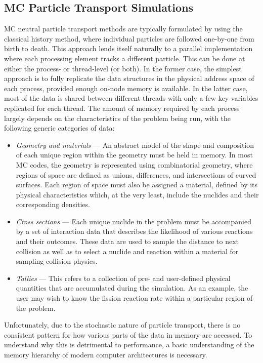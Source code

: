 \documentclass{mc2015}
\begin{document}
\subsection{MC Particle Transport Simulations}

MC neutral particle transport methods are typically formulated by using the
classical history method, where individual particles are followed one-by-one
from birth to death. This approach lends itself naturally to a parallel
implementation where each processing element tracks a different particle. This
can be done at either the process- or thread-level (or both). In the former
case, the simplest approach is to fully replicate the data structures in the
physical address space of each process, provided enough on-node memory is
available. In the latter case, most of the data is shared between different
threads with only a few key variables replicated for each thread. The amount of
memory required by each process largely depends on the characteristics of the
problem being run, with the following generic categories of data:
\begin{itemize}
\item \emph{Geometry and materials} --- An abstract model of the shape and
  composition of each unique region within the geometry must be held in
  memory. In most MC codes, the geometry is represented using combinatorial
  geometry, where regions of space are defined as unions, differences, and
  intersections of curved surfaces. Each region of space must also be assigned a
  material, defined by its physical characteristics which, at the very least,
  include the nuclides and their corresponding densities.
\item \emph{Cross sections} --- Each unique nuclide in the problem must be
  accompanied by a set of interaction data that describes the likelihood of
  various reactions and their outcomes. These data are used to sample the
  distance to next collision as well as to select a nuclide and reaction within
  a material for sampling collision physics.
\item \emph{Tallies} --- This refers to a collection of pre- and user-defined
  physical quantities that are accumulated during the simulation. As an
  example, the user may wish to know the fission reaction rate within a
  particular region of the problem.
\end{itemize}
Unfortunately, due to the stochastic nature of particle transport, there is no
consistent pattern for how various parts of the data in memory are accessed. To
understand why this is detrimental to performance, a basic understanding of the
memory hierarchy of modern computer architectures is necessary.
\end{document}
